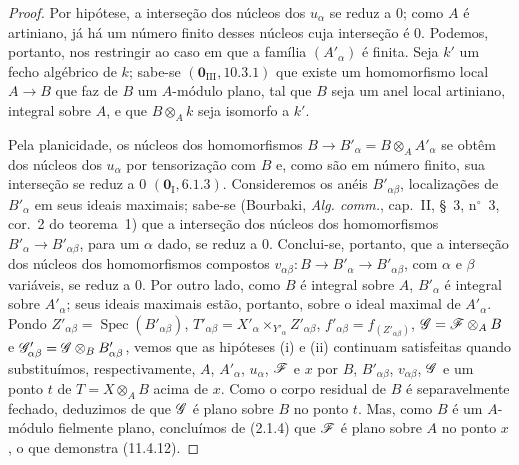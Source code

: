 \begin{proof}

Por hipótese, a interseção
dos núcleos dos $u_\alpha$
se reduz a $0$; como $A$
é artiniano, já há um
número finito desses
núcleos cuja interseção é
$0$. Podemos, portanto,
nos restringir ao caso em
que a família
$(A'_\alpha)$ é finita.
Seja $k'$ um fecho
algébrico de $k$; sabe-se
$(\mathbf{0}_{\mathrm{III}},
10.3.1)$ que existe um
homomorfismo local
$A\to B$ que faz de $B$
um $A$-módulo plano, tal
que $B$ seja um anel local
artiniano, integral sobre
$A$, e que $B\otimes_A k$
seja isomorfo a $k'$.

Pela planicidade, os
núcleos dos homomorfismos
$B\to B'_\alpha=
B\otimes_A A'_\alpha$
se obtêm dos núcleos dos
$u_\alpha$ por tensorização
com $B$ e, como são em
número finito, sua
interseção se reduz a $0$
$(\mathbf{0}_{\mathrm I},
6.1.3)$. Consideremos os
anéis $B'_{\alpha\beta}$,
localizações de $B'_\alpha$
em seus ideais maximais;
sabe-se (Bourbaki,
\emph{Alg. comm.}, cap.~II,
\S~3, n$^\circ$~3,
cor.~2 do teorema~1) que
a interseção dos núcleos
dos homomorfismos
$B'_\alpha\to
B'_{\alpha\beta}$, para
um $\alpha$ dado, se
reduz a $0$. Conclui-se,
portanto, que a interseção
dos núcleos dos
homomorfismos compostos
$v_{\alpha\beta}:B\to
B'_\alpha\to
B'_{\alpha\beta}$, com
$\alpha$ e $\beta$
variáveis, se reduz a $0$.
Por outro lado, como $B$
é integral sobre $A$,
$B'_\alpha$ é integral
sobre $A'_\alpha$; seus
ideais maximais estão,
portanto, sobre o ideal
maximal de $A'_\alpha$.
Pondo
$Z'_{\alpha\beta}=
\operatorname{Spec}(B'_{\alpha\beta})$,
$T'_{\alpha\beta}=
X'_\alpha\times_{Y'_\alpha}
Z'_{\alpha\beta}$,
$f'_{\alpha\beta}=
f_{(Z'_{\alpha\beta})}$,
$\mathscr{G}=\mathscr{F}\otimes_A B$
e $\mathscr{G}'_{\alpha\beta}=
\mathscr{G}\otimes_B
B'_{\alpha\beta}$, vemos
que as hipóteses (i) e
(ii) continuam satisfeitas
quando substituímos,
respectivamente, $A$,
$A'_\alpha$, $u_\alpha$,
$\mathscr{F}$ e $x$ por $B$,
$B'_{\alpha\beta}$,
$v_{\alpha\beta}$,
$\mathscr{G}$ e um ponto $t$
de $T=X\otimes_A B$
acima de $x$. Como o
corpo residual de $B$ é
separavelmente fechado,
deduzimos de
 que
$\mathscr{G}$ é plano sobre
$B$ no ponto $t$. Mas,
como $B$ é um $A$-módulo
fielmente plano, concluímos
de (2.1.4) que $\mathscr{F}$
é plano sobre $A$ no
ponto $x$, o que demonstra
(11.4.12).
\end{proof}


